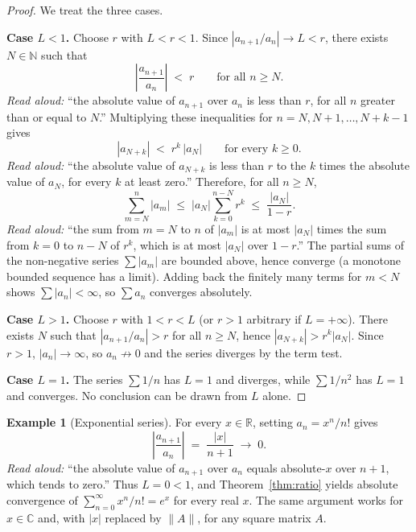 \documentclass[11pt]{article}
\theoremstyle{definition}
\newtheorem{example}[theorem]{Example}
\begin{document}
\begin{proof}
We treat the three cases.

\textbf{Case $L < 1$.} Choose $r$ with $L < r < 1$. Since
$|a_{n+1}/a_n| \to L < r$, there exists $N \in \mathbb{N}$ such that
\[
  \left| \frac{a_{n+1}}{a_n} \right| \;<\; r \qquad \text{for all } n \ge N.
\]
\emph{Read aloud:} ``the absolute value of $a_{n+1}$ over $a_n$ is less than
$r$, for all $n$ greater than or equal to $N$.''
Multiplying these inequalities for $n = N, N+1, \dots, N + k - 1$ gives
\[
  |a_{N+k}| \;<\; r^k\,|a_N| \qquad \text{for every } k \ge 0.
\]
\emph{Read aloud:} ``the absolute value of $a_{N+k}$ is less than $r$ to the
$k$ times the absolute value of $a_N$, for every $k$ at least zero.''
Therefore, for all $n \ge N$,
\[
  \sum_{m=N}^{n} |a_m|
  \;\le\;
  |a_N| \sum_{k=0}^{n-N} r^k
  \;\le\;
  \frac{|a_N|}{1 - r}.
\]
\emph{Read aloud:} ``the sum from $m = N$ to $n$ of $|a_m|$ is at most
$|a_N|$ times the sum from $k = 0$ to $n - N$ of $r^k$, which is at most
$|a_N|$ over $1 - r$.''
The partial sums of the non-negative series $\sum |a_m|$ are bounded above,
hence converge (a monotone bounded sequence has a limit). Adding back the
finitely many terms for $m < N$ shows $\sum |a_n| < \infty$, so $\sum a_n$
converges absolutely.

\textbf{Case $L > 1$.} Choose $r$ with $1 < r < L$ (or $r > 1$ arbitrary if
$L = +\infty$). There exists $N$ such that
$|a_{n+1}/a_n| > r$ for all $n \ge N$, hence $|a_{N+k}| > r^k |a_N|$. Since
$r > 1$, $|a_n| \to \infty$, so $a_n \not\to 0$ and the series diverges by
the term test.

\textbf{Case $L = 1$.} The series $\sum 1/n$ has $L = 1$ and diverges, while
$\sum 1/n^2$ has $L = 1$ and converges. No conclusion can be drawn from $L$
alone.
\end{proof}

\begin{example}[Exponential series]
For every $x \in \mathbb{R}$, setting $a_n = x^n / n!$ gives
\[
  \left| \frac{a_{n+1}}{a_n} \right|
  \;=\;
  \frac{|x|}{n+1}
  \;\longrightarrow\;
  0.
\]
\emph{Read aloud:} ``the absolute value of $a_{n+1}$ over $a_n$ equals
absolute-$x$ over $n + 1$, which tends to zero.''
Thus $L = 0 < 1$, and Theorem~\ref{thm:ratio} yields absolute convergence of
$\sum_{n=0}^{\infty} x^n / n! = e^x$ for every real $x$. The same argument
works for $x \in \mathbb{C}$ and, with $|x|$ replaced by $\|A\|$, for any
square matrix $A$.
\end{example}
\end{document}
